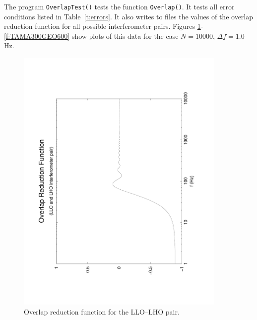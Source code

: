 \documentclass{article}
\begin{document}
The program {\tt OverlapTest()\/} tests the function {\tt Overlap()\/}.  
It tests all error conditions listed in Table~\ref{t:errors}.  
It also writes to files the values of the overlap reduction function
for all possible interferometer pairs.
Figures \ref{f:LLOLHO}-\ref{f:TAMA300GEO600} show plots of this data
for the case $N=10000$, $\Delta f= 1.0$ Hz.
%
\begin{figure}[htb!]
\begin{center}
\noindent\includegraphics[width=4in,angle=-90]{LLOLHO}
\caption{\label{f:LLOLHO}
Overlap reduction function for the LLO--LHO pair.}
\end{center}
\end{figure}
%
%
\end{document}
